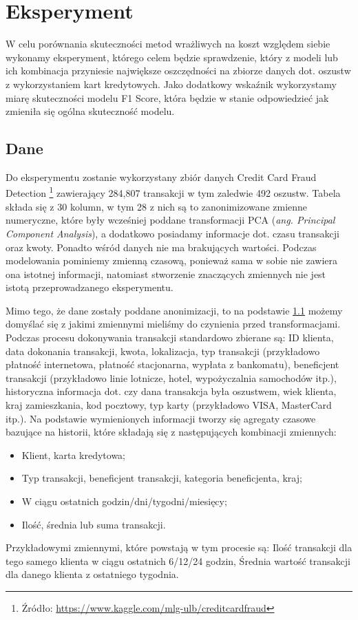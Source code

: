 \documentclass[inzynierska]{pwr_wmat_praca_dyplomowa}
\theoremstyle{plain}
\numberwithin{theorem}{chapter}
\theoremstyle{definition}
\numberwithin{theorem}{chapter}
\begin{document}
\chapter{Eksperyment}
W celu porównania skuteczności metod wrażliwych na koszt względem siebie wykonamy eksperyment, którego celem będzie sprawdzenie, który z modeli lub ich kombinacja przyniesie największe oszczędności na zbiorze danych dot. oszustw z wykorzystaniem kart kredytowych. Jako dodatkowy wskaźnik wykorzystamy miarę skuteczności modelu F1 Score, która będzie w stanie odpowiedzieć jak zmieniła się ogólna skuteczność modelu.

\section{Dane}
Do eksperymentu zostanie wykorzystany zbiór danych Credit Card Fraud Detection \footnote{Źródło: \url{https://www.kaggle.com/mlg-ulb/creditcardfraud}} zawierający 284,807 transakcji w tym zaledwie 492 oszustw. Tabela składa się z 30 kolumn, w tym 28 z nich są to zanonimizowane zmienne numeryczne, które były wcześniej poddane transformacji PCA (\textit{ang. Principal Component Analysis}), a dodatkowo posiadamy informacje dot. czasu transakcji oraz kwoty. Ponadto wśród danych nie ma brakujących wartości. Podczas modelowania pominiemy zmienną czasową, ponieważ sama w sobie nie zawiera ona istotnej informacji, natomiast stworzenie znaczących zmiennych nie jest istotą przeprowadzanego eksperymentu. 

Mimo tego, że dane zostały poddane anonimizacji, to na podstawie \ref{} możemy domyślać się z jakimi zmiennymi mieliśmy do czynienia przed transformacjami. Podczas procesu dokonywania transakcji standardowo zbierane są: ID klienta, data dokonania transakcji, kwota, lokalizacja, typ transakcji (przykładowo płatność internetowa, płatność stacjonarna, wypłata z bankomatu), beneficjent transakcji (przykładowo linie lotnicze, hotel, wypożyczalnia samochodów itp.), historyczna informacja dot. czy dana transakcja była oszustwem, wiek klienta, kraj zamieszkania, kod pocztowy, typ karty (przykładowo VISA, MasterCard itp.). Na podstawie wymienionych informacji tworzy się agregaty czasowe bazujące na historii, które składają się z następujących kombinacji zmiennych:
\begin{itemize}
	\item Klient, karta kredytowa;
	\item Typ transakcji, beneficjent transakcji, kategoria beneficjenta, kraj;
	\item W ciągu ostatnich godzin/dni/tygodni/miesięcy;
	\item Ilość, średnia lub suma transakcji.
\end{itemize}
Przykładowymi zmiennymi, które powstają w tym procesie są: Ilość transakcji dla tego samego klienta w ciągu ostatnich 6/12/24 godzin, Średnia wartość transakcji dla danego klienta z ostatniego tygodnia. 
\end{document}
